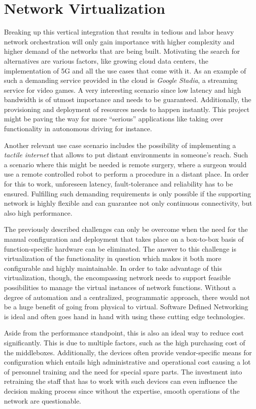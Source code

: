 \section{Network Virtualization}
\label{sec:networkV}
Breaking up this vertical integration that results in tedious and labor heavy network orchestration will only gain importance with higher complexity and higher demand of the networks that are being built. Motivating the search for alternatives are various factors, like growing cloud data centers, the implementation of 5G and all the use cases that come with it. As an example of such a demanding service provided in the cloud is \textit{Google Stadia}, a streaming service for video games. A very interesting scenario since low latency and high bandwidth is of utmost importance and needs to be guaranteed. Additionally, the provisioning and deployment of resources needs to happen instantly. This project might be paving the way for more ``serious'' applications like taking over functionality in autonomous driving for instance. 

Another relevant use case scenario includes the possibility of implementing a \textit{tactile internet} that allows to put distant environments in someone's reach. Such a scenario where this might be needed is remote surgery, where a surgeon would use a remote controlled robot to perform a procedure in a distant place. In order for this to work, unforeseen latency, fault-tolerance and reliability has to be ensured. Fulfilling such demanding requirements is only possible if the supporting network is highly flexible and can guarantee not only continuous connectivity, but also high performance. 

The previously described challenges can only be overcome when the need for the manual configuration and deployment that takes place on a box-to-box basis of function-specific hardware can be eliminated. The answer to this challenge is virtualization of the functionality in question which makes it both more configurable and highly maintainable. In order to take advantage of this virtualization, though, the encompassing network needs to support feasible possibilities to manage the virtual instances of network functions. Without a degree of automation and a centralized, programmatic approach, there would not be a huge benefit of going from physical to virtual. Software Defined Networking is ideal and often goes hand in hand with using these cutting edge technologies.

Aside from the performance standpoint, this is also an ideal way to reduce cost significantly. This is due to multiple factors, such as the high purchasing cost of the middleboxes. Additionally, the devices often provide vendor-specific means for configuration which entails high administrative and operational cost causing a lot of personnel training and the need for special spare parts. The investment into retraining the staff that has to work with such devices can even influence the decision making process since without the expertise, smooth operations of the network are questionable. 

